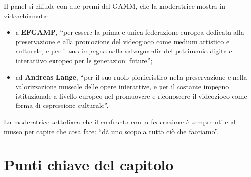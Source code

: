 Il panel si chiude con due premi del GAMM, che la moderatrice mostra in
videochiamata:
\begin{itemize}
  \item a \textbf{EFGAMP}, ``per essere la prima e unica federazione europea
        dedicata alla preservazione e alla promozione del videogioco come medium
        artistico e culturale, e per il suo impegno nella salvaguardia del
        patrimonio digitale interattivo europeo per le generazioni future'';
  \item ad \textbf{Andreas Lange}, ``per il suo ruolo pionieristico nella
        preservazione e nella valorizzazione museale delle opere interattive, e
        per il costante impegno istituzionale a livello europeo nel promuovere e
        riconoscere il videogioco come forma di espressione culturale''.
\end{itemize}
La moderatrice sottolinea che il confronto con la federazione è sempre utile al
museo per capire che cosa fare: ``dà uno scopo a tutto ciò che facciamo''.

\section*{Punti chiave del capitolo}

